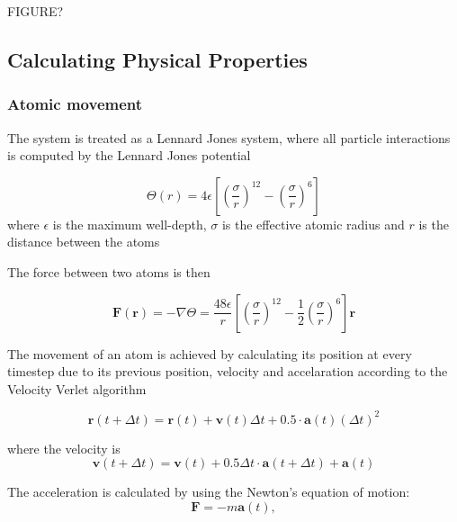 \documentclass[12pt,a4paper]{article}
\begin{document}
FIGURE?


\subsection{Calculating Physical Properties}
\label{sec:calculating_physical_properties}

\subsubsection{Atomic movement}
The system is treated as a Lennard Jones system, where all particle interactions is computed by the Lennard Jones potential 

\begin{equation}
\label{eq:LJ}
\Theta(r)=4 \epsilon \left[\left(\frac{\sigma}{r}\right)^{12} - \left(\frac{\sigma}{r}\right)^6\right]
\end{equation}
where \( \epsilon\) is the maximum well-depth, \( \sigma \) is the effective atomic radius and \( r\) is the distance between the atoms

The force between two atoms is then

\begin{equation}
\mathbf F(\mathbf r) = - \nabla \Theta = \frac{48\epsilon}{r} \left[\left(\frac{\sigma}{r}\right)^{12} - \frac 1 2 \left(\frac{\sigma}{r}\right)^6\right] \mathbf r
\end{equation}

The movement of an atom is achieved by calculating its position at every timestep due to its previous position, velocity and accelaration according to the Velocity Verlet algorithm

\begin{equation}
\label{eq:newPos}
\mathbf r(t+\Delta t) =\mathbf r(t) + \mathbf v(t)\Delta t + 0.5 \cdot \mathbf a(t) (\Delta t)^2
\end{equation}

where the velocity is 
\begin{equation}
\label{eq:velVerlet}
\mathbf v(t+\Delta t) = \mathbf v(t) + 0.5\Delta t  \cdot \mathbf a(t+\Delta t) + \mathbf a(t)
\end{equation}

The acceleration is calculated by using the Newton's equation of motion:
\begin{equation}
\label{eq:acceleration}
\mathbf F = -m\mathbf a(t),
\end{equation}
\end{document}
